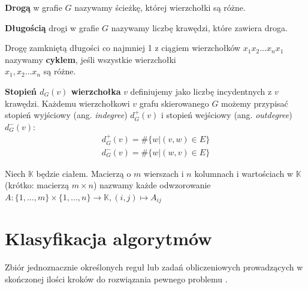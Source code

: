 \begin{definicja}[Droga]\label{def:droga}
\textbf{Drogą} w grafie \(G\) nazywamy ścieżkę, której wierzchołki są różne.
\end{definicja}

\begin{definicja}\label{def:dlugosc_drogi}
\textbf{Długością} drogi w grafie \(G\) nazywamy liczbę krawędzi, które zawiera droga.
\end{definicja}
\begin{definicja}[Cykl]\label{def:cykl_w_grafie}
Drogę zamkniętą długości co najmniej 1 z ciągiem wierzchołków \(x_1 x_2\dots x_n x_1\) nazywamy \textbf{cyklem}, jeśli wszystkie wierzchołki\\ \(x_1, x_2\dots x_n\) są różne.
\end{definicja}

\begin{definicja}\label{def:stopien_node}
\textbf{Stopień \(d_{G}(v)\) wierzchołka} \(v\) definiujemy jako liczbę incydentnych z \(v\) krawędzi. Każdemu wierzchołkowi \(v\) grafu skierowanego \(G\) możemy przypisać stopień wyjściowy (ang. \emph{indegree}) \(d_{G}^{+}(v)\) i stopień wejściowy (ang. \emph{outdegree}) \(d_{G}^{-}(v)\):
\begin{align*}
 d_{G}^{+}(v) = \#\{w|(v,w)\in E\}\\ 
 d_{G}^{-}(v) = \#\{w|(w,v)\in E\}
\end{align*}
\end{definicja}

\begin{definicja}[Macierz]\label{def:matrix}
Niech \(\mathbb{K}\) będzie ciałem. Macierzą o \(m\) wierszach i \(n\) kolumnach i wartościach w \(\mathbb{K}\) (krótko: macierzą \(m\times n\)) nazwamy każde odwzorowanie \(A:\{1,\dots, m\}\times \{1, \dots, n\}\xrightarrow{} \mathbb{K}, (i,j)\longmapsto A_{ij}\)
\end{definicja}



\newpage

\section{Klasyfikacja algorytmów}

\begin{definicja}[Algorytm]\label{def:algorytm}
Zbiór jednoznacznie określonych reguł lub zadań obliczeniowych prowadzących w skończonej ilości kroków do rozwiązania pewnego problemu \cite{IEEE}.\\
\end{definicja}

